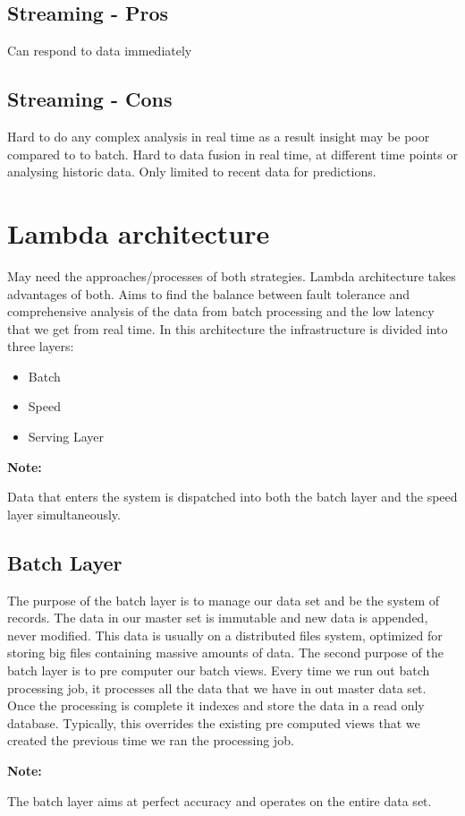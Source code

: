 \documentclass[a4paper, 11pt]{book}
\newenvironment{note}{
    \begin{siderule}
        \textbf{Note: }
        }{
    \end{siderule}}
\begin{document}
    \subsection{Streaming - Pros}
    Can respond to data immediately

    \subsection{Streaming - Cons}
    Hard to do any complex analysis in real time as a result insight may be poor compared to to batch.
    Hard to data fusion in real time, at different time points or analysing historic data.
    Only limited to recent data for predictions.


    \section{Lambda architecture}
    May need the approaches/processes of both strategies.
    Lambda architecture takes advantages of both.
    Aims to find the balance between fault tolerance and comprehensive analysis of the data from batch processing and the low latency that we get from real time.
    In this architecture the infrastructure is divided into three layers:
    \begin{itemize}
        \item Batch
        \item Speed
        \item Serving Layer
    \end{itemize}

    \begin{note}
        Data that enters the system is dispatched into both the batch layer and the speed layer simultaneously.
    \end{note}

    \subsection{Batch Layer}
    The purpose of the batch layer is to manage our data set and be the system of records.
    The data in our master set is immutable and new data is appended, never modified.
    This data is usually on a distributed files system, optimized for storing big files containing massive amounts of data.
    The second purpose of the batch layer is to pre computer our batch views.
    Every time we run out batch processing job, it processes all the data that we have in out master data set.
    Once the processing is complete it indexes and store the data in a read only database.
    Typically, this overrides the existing pre computed views that we created the previous time we ran the processing job.
    \begin{note}
        The batch layer aims at perfect accuracy and operates on the entire data set.
    \end{note}
\end{document}
